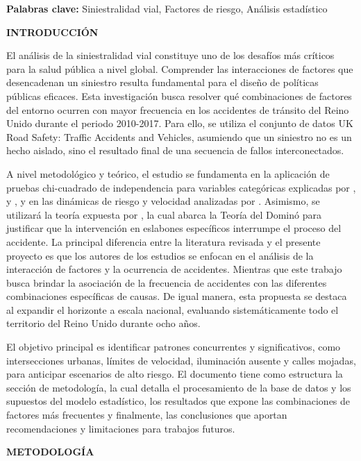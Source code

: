 \documentclass[11pt]{article}
\newcommand{\seccion}[1]{%
  \vspace{1.2em}
  \begin{center}\textbf{#1}\end{center}
  \vspace{0.3em}
}
\begin{document}
\noindent \textbf{Palabras clave:} Siniestralidad vial, Factores de riesgo, Análisis estadístico

\seccion{INTRODUCCIÓN}

El análisis de la siniestralidad vial constituye uno de los desafíos más críticos
  para la salud pública a nivel global. Comprender las interacciones de factores que
  desencadenan un siniestro resulta fundamental para el diseño de políticas públicas 
  eficaces. Esta investigación busca resolver qué combinaciones de factores del 
  entorno ocurren con mayor frecuencia en los accidentes de tránsito del Reino Unido
  durante el periodo 2010-2017. Para ello, se utiliza el conjunto de datos UK Road 
  Safety: Traffic Accidents and Vehicles, asumiendo que un siniestro no es un hecho 
  aislado, sino el resultado final de una secuencia de fallos interconectados.
  
  A nivel metodológico y teórico, el estudio se fundamenta en la aplicación de
  pruebas chi-cuadrado de independencia para variables categóricas explicadas
  por \textcite{McHugh2013}, \textcite{LASTRE2019} y \textcite{Agresti2002}, y 
  en las dinámicas de riesgo y velocidad analizadas por \textcite{TAYLOR2000}. 
  Asimismo, se utilizará la teoría expuesta por \textcite{SAXENA2017}, la cual 
  abarca la Teoría del Dominó para justificar que la intervención en eslabones 
  específicos interrumpe el proceso del accidente. La principal diferencia entre 
  la literatura revisada y el presente proyecto es que los autores de los estudios 
  se enfocan en el análisis de la interacción de factores y la ocurrencia de 
  accidentes. Mientras que este trabajo busca brindar la asociación de la frecuencia
  de accidentes con las diferentes combinaciones específicas de causas. De igual 
  manera, esta propuesta se destaca al expandir el horizonte a escala nacional, 
  evaluando sistemáticamente todo el territorio del Reino Unido durante ocho años.
  
  El objetivo principal es identificar patrones concurrentes y significativos, 
  como intersecciones urbanas, límites de velocidad, iluminación ausente y calles 
  mojadas, para anticipar escenarios de alto riesgo. El documento tiene como 
  estructura la sección de metodología, la cual detalla el procesamiento de la
  base de datos y los supuestos del modelo estadístico, los resultados que expone
  las combinaciones de factores más frecuentes y finalmente, las conclusiones que 
  aportan recomendaciones y limitaciones para trabajos futuros.

\seccion{METODOLOGÍA}
\end{document}
